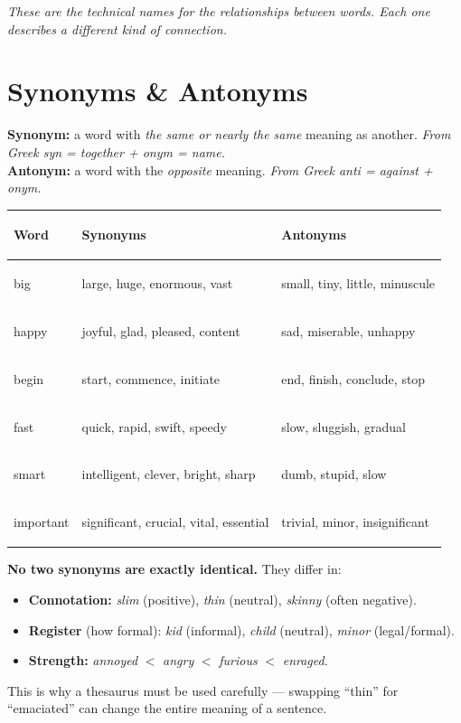 \documentclass[11pt, letterpaper]{article}
\begin{document}
\vspace{6pt}
\begin{center}\small\itshape
  These are the technical names for the relationships between words.
  Each one describes a different kind of connection.
\end{center}

\section*{Synonyms \& Antonyms}

\textbf{Synonym:} a word with \emph{the same or nearly the same} meaning as another. \textit{From Greek \emph{syn} = together + \emph{onym} = name.}\\[4pt]
\textbf{Antonym:} a word with the \emph{opposite} meaning. \textit{From Greek \emph{anti} = against + \emph{onym}.}

\noindent
{\renewcommand{\arraystretch}{1.5}
\begin{tabularx}{\textwidth}{>{\bfseries\raggedright\arraybackslash}p{3cm}
                              >{\raggedright\arraybackslash}X
                              >{\raggedright\arraybackslash}X}
\toprule
\rowcolor{tableheadergreen}
\textbf{Word} & \textbf{Synonyms} & \textbf{Antonyms} \\
\midrule
\rowcolor{rowA}  big          & large, huge, enormous, vast            & small, tiny, little, minuscule \\
\rowcolor{rowBg} happy        & joyful, glad, pleased, content         & sad, miserable, unhappy \\
\rowcolor{rowA}  begin        & start, commence, initiate              & end, finish, conclude, stop \\
\rowcolor{rowBg} fast         & quick, rapid, swift, speedy            & slow, sluggish, gradual \\
\rowcolor{rowA}  smart        & intelligent, clever, bright, sharp     & dumb, stupid, slow \\
\rowcolor{rowBg} important    & significant, crucial, vital, essential & trivial, minor, insignificant \\
\bottomrule
\end{tabularx}}

\begin{tcolorbox}[colback=part2bg, colframe=sectiongreen, arc=3pt, boxrule=1pt]
\textbf{No two synonyms are exactly identical.} They differ in:
\begin{itemize}[noitemsep, leftmargin=*]
  \item \textbf{Connotation:} \emph{slim} (positive), \emph{thin} (neutral), \emph{skinny} (often negative).
  \item \textbf{Register} (how formal): \emph{kid} (informal), \emph{child} (neutral), \emph{minor} (legal/formal).
  \item \textbf{Strength:} \emph{annoyed} $<$ \emph{angry} $<$ \emph{furious} $<$ \emph{enraged}.
\end{itemize}
This is why a thesaurus must be used carefully --- swapping ``thin'' for ``emaciated'' can change the entire meaning of a sentence.
\end{tcolorbox}
\end{document}
